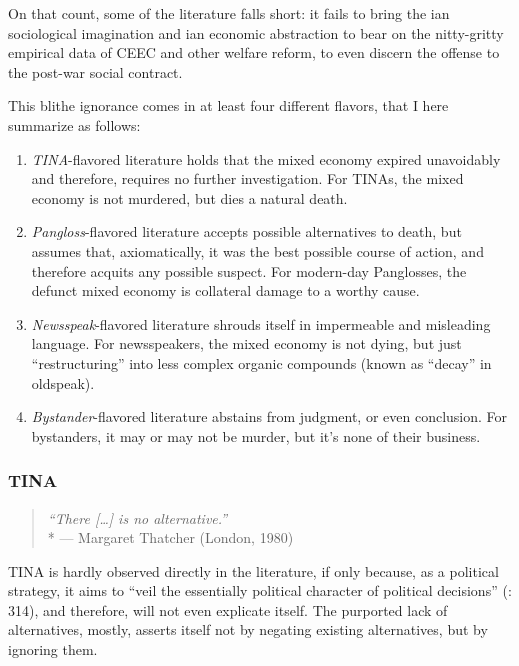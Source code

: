 \documentclass[11pt,a4paper,oneside,openright]{article}
\begin{document}
On that count, some of the literature falls short: 
it fails to bring the \citeauthor{Mills-1959-aa}ian sociological imagination and \citeauthor{Keynes1936}ian economic abstraction to bear on the nitty-gritty empirical data of \gls{CEEC} and other welfare reform, to even discern  the offense to the post-war social contract. 

This blithe ignorance comes in at least four different flavors, that I here summarize as follows:
\begin{enumerate}
	\item \emph{TINA}-flavored literature holds that the mixed economy expired unavoidably and therefore, requires no further investigation. 
	For TINAs, the mixed economy is not murdered, but dies a natural death.
	\item \emph{Pangloss}-flavored literature accepts possible alternatives to death, but assumes that, axiomatically, it was the best possible course of action, and therefore acquits any possible suspect. 
	For modern-day Panglosses, the defunct mixed economy is collateral damage to a worthy cause.
	\item \emph{Newsspeak}-flavored literature shrouds itself in impermeable and misleading language. 
	For newsspeakers, the mixed economy is not dying, but just ``restructuring'' into less complex organic compounds (known as ``decay'' in oldspeak).
	\item \emph{Bystander}-flavored literature abstains from judgment, or even conclusion. 
	For bystanders, it may or may not be murder, but it's none of their business. %
\end{enumerate}

\subsubsection{TINA}

\begin{quote}
	\emph{``There [\ldots] is no alternative.''}\\*
	--- Margaret Thatcher (London, 1980)
\end{quote}

TINA is hardly observed directly in the literature, if only because, as a political strategy, it aims to ``veil the essentially political character of political decisions'' (\citealt{Bluhdorn-2007-aa}: 314), and therefore, will not even explicate itself. 
The purported lack of alternatives, mostly, asserts itself not by negating existing alternatives, but by ignoring them.  
\end{document}
